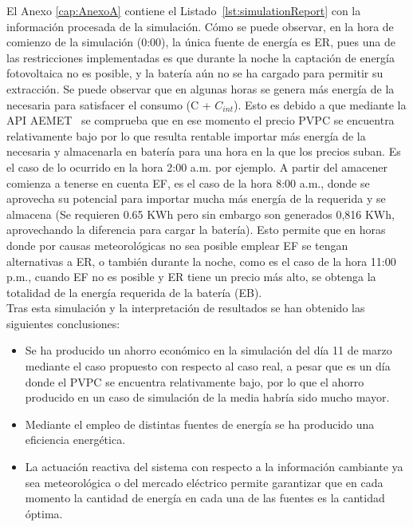 El Anexo \ref{cap:AnexoA} contiene el Listado~\ref{lst:simulationReport} con la información procesada de la simulación. Cómo se puede observar, en la hora de comienzo de la simulación (0:00), la única fuente de energía es \gls{ER}, pues una de las restricciones implementadas es que durante la noche la captación de energía fotovoltaica no es posible, y la batería aún no se ha cargado para permitir su extracción. Se puede observar que en algunas horas se genera más energía de la necesaria para satisfacer el consumo (C + $ C_{int} $). Esto es debido a que mediante la \gls{API} \gls{AEMET}~\cite{Ree} se comprueba que en ese momento el precio \gls{PVPC} se encuentra relativamente bajo por lo que resulta rentable importar más energía de la necesaria y almacenarla en batería para una hora en la que los precios suban. Es el caso de lo ocurrido en la hora 2:00 a.m. por ejemplo. A partir del amacener comienza a tenerse en cuenta \gls{EF}, es el caso de la hora 8:00 a.m., donde se aprovecha su potencial para importar mucha más energía de la requerida y se almacena (Se requieren 0.65 KWh pero sin embargo son generados 0,816 KWh, aprovechando la diferencia para cargar la batería). Esto permite que en horas donde por causas meteorológicas no sea posible emplear \gls{EF} se tengan alternativas a \gls{ER}, o también durante la noche, como es el caso de la hora 11:00 p.m., cuando \gls{EF} no es posible y \gls{ER} tiene un precio más alto, se obtenga la totalidad de la energía requerida de la batería (\gls{EB}).\\

Tras esta simulación y la interpretación de resultados se han obtenido las siguientes conclusiones:
\begin{itemize}
\item Se ha producido un ahorro económico en la simulación del día 11 de marzo mediante el caso propuesto con respecto al caso real, a pesar que es un día donde el \gls{PVPC} se encuentra relativamente bajo, por lo que el ahorro producido en un caso de simulación de la media habría sido mucho mayor.
\item Mediante el empleo de distintas fuentes de energía se ha producido una eficiencia energética.
  \item La actuación reactiva del sistema con respecto a la información cambiante ya sea meteorológica o del mercado eléctrico permite garantizar que en cada momento la cantidad de energía en cada una de las fuentes es la cantidad óptima.
\end{itemize}
